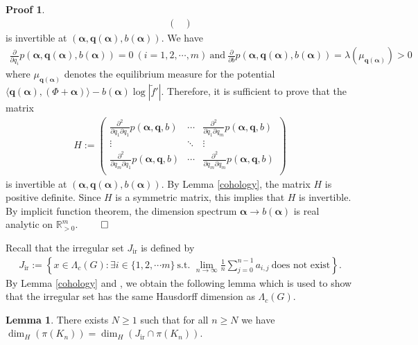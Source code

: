 \documentclass{article}
\theoremstyle{definition}
\newtheorem{lemma}[thm]{Lemma}
\newtheorem*{pf}{Proof}
\begin{document}
\begin{pf}
\begin{align}
\begin{pmatrix}
\end{pmatrix}    
\end{align}
is invertible at $(\boldsymbol{\alpha},\boldsymbol{q}(\boldsymbol{\alpha}),b(\boldsymbol{\alpha}))$. We have 
\begin{align}\nonumber
    \frac{\partial}{\partial q_i}p(\boldsymbol{\alpha},\boldsymbol{q}(\boldsymbol{\alpha}),b(\boldsymbol{\alpha}))=0\ (i=1,2,\cdots,m)\ \text{and}\ \nonumber
    \frac{\partial}{\partial b}p(\boldsymbol{\alpha},\boldsymbol{q}(\boldsymbol{\alpha}),b(\boldsymbol{\alpha}))=\lambda(\mu_{\boldsymbol{q}(\boldsymbol{\alpha})})>0\nonumber
\end{align}
where $\mu_{\boldsymbol{q}(\boldsymbol{\alpha})}$ denotes the equilibrium measure for the potential $\langle\boldsymbol{q}(\boldsymbol{\alpha}),(\Phi+\boldsymbol{\alpha})\rangle-b(\boldsymbol{\alpha})\log|\tilde f'|$. Therefore, it is sufficient to prove that the matrix 
\begin{align}\nonumber H:=
\begin{pmatrix}
\frac{\partial^2}{\partial q_1\partial q_1}p(\boldsymbol{\alpha},\boldsymbol{q},b)
&\cdots
&\frac{\partial^2}{\partial q_1\partial q_m}p(\boldsymbol{\alpha},\boldsymbol{q},b)\\
\vdots&\ddots&\vdots\\
\frac{\partial^2}{\partial q_m\partial q_1}p(\boldsymbol{\alpha},\boldsymbol{q},b)
&\cdots
&\frac{\partial^2}{\partial q_m\partial q_m}p(\boldsymbol{\alpha},\boldsymbol{q},b)\\
\end{pmatrix}    
\end{align}
is invertible at $(\boldsymbol{\alpha},\boldsymbol{q}(\boldsymbol{\alpha}),b(\boldsymbol{\alpha}))$.
 By Lemma \ref{cohology}, the matrix $H$ is positive definite. Since $H$ is a symmetric matrix, this implies that $H$ is invertible. By implicit function theorem, the dimension spectrum $\boldsymbol{\alpha}\rightarrow b(\boldsymbol{\alpha})$ is real analytic on $\mathbb{R}_{>0}^m$.
$\qed$    
\end{pf}




Recall that the irregular set $J_{\text{ir}}$ is defined by 
\begin{align*}
    J_{\text{ir}}:=\left\{x\in\Lambda_c(G):\exists i\in\{1,2,\cdots m\}\ \text{s.t.\ }\lim_{n\to\infty}\frac{1}{n}\sum_{j=0}^{n-1}a_{i,j}\ \text{does\ not\ exist}\right\}.
\end{align*}
By Lemma \ref{cohology} and {\cite[Theorem 7.5]{barreira2000sets}}, we obtain the following lemma which is used to show that the irregular set has the same Hausdorff dimension as $\Lambda_c(G)$.
\begin{lemma}\label{irregular set}
    There exists $N\geq 1$ such that for all $n\geq N$ we have $\dim_H(\pi(K_n))=\dim_H(J_{\text{ir}}\cap \pi(K_n))$.
\end{lemma}
\end{document}
